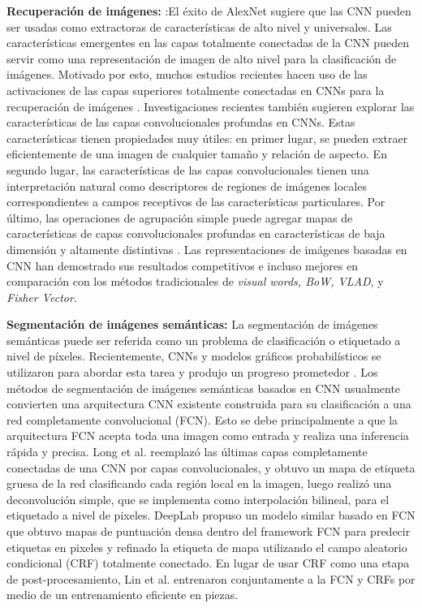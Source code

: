 \textbf{Recuperación de imágenes:} :El éxito de AlexNet \cite{Krizhevsky} sugiere que las CNN pueden ser usadas como extractoras de características de alto nivel y universales. Las características emergentes en las capas totalmente conectadas de la CNN pueden servir como una representación de imagen de alto nivel para la clasificación de imágenes. Motivado por esto, muchos estudios recientes hacen uso de las activaciones de las capas superiores totalmente conectadas en CNNs para la recuperación de imágenes \cite{Gong,Liu,Sharif,Wan,Sun,Babenko}. Investigaciones recientes también sugieren explorar las características de las capas convolucionales profundas en CNNs. Estas características tienen propiedades muy útiles: en primer lugar, se pueden extraer eficientemente de una imagen de cualquier tamaño y relación de aspecto. En segundo lugar, las características de las capas convolucionales tienen una interpretación natural como descriptores de regiones de imágenes locales correspondientes a campos receptivos de las características particulares. Por último, las operaciones de agrupación simple puede agregar mapas de características de capas convolucionales profundas en características de baja dimensión y altamente distintivas \cite{Gong,Sharif,Babenko,RazavianAS,BabenkoA}. Las representaciones de imágenes basadas en CNN han demostrado sus resultados competitivos e incluso mejores en comparación con los métodos tradicionales de  \textit{visual words,  BoW, VLAD}, y \textit{Fisher Vector}.

\textbf{Segmentación de imágenes semánticas:} La segmentación de imágenes semánticas puede ser referida como un problema de clasificación o etiquetado a nivel de píxeles. Recientemente, CNNs y modelos gráficos probabilísticos se utilizaron para abordar esta tarea y produjo un progreso prometedor \cite{ZhengS,LiuZ,Long,ChenLC,LinG}. Los métodos de segmentación de imágenes semánticas basados en CNN usualmente convierten una arquitectura CNN existente construida para su clasificación a una red completamente convolucional (FCN). Esto se debe principalmente a que la arquitectura FCN acepta toda una imagen como entrada y realiza una inferencia rápida y precisa. Long et al. \cite{Long} reemplazó las últimas capas completamente conectadas de una CNN por capas convolucionales, y obtuvo un mapa de etiqueta gruesa de la red clasificando cada región local en la imagen, luego realizó una deconvolución simple, que se implementa como interpolación bilineal, para el etiquetado a nivel de pixeles. DeepLab \cite{ChenLC} propuso un modelo similar basado en FCN que obtuvo mapas de puntuación densa dentro del framework FCN  para predecir etiquetas en pixeles y refinado la etiqueta de mapa utilizando el campo aleatorio condicional (CRF) totalmente conectado. En lugar de usar CRF como una etapa de post-procesamiento, Lin et al. \cite{LinG} entrenaron conjuntamente a la FCN y CRFs por medio de un entrenamiento eficiente en piezas.

